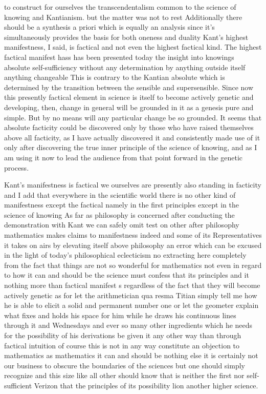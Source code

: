 \documentclass{article}
\begin{document}
to construct for ourselves the transcendentalism
common to the science of knowing and Kantianism.
but the matter was not to rest
Additionally there should be a synthesis a priori
which is equally an analysis
since it's simultaneously provides the basis for both oneness and duality 
Kant's highest manifestness, I said, is factical and not even the highest factical kind.
The highest factical manifest hass has been presented today 
the insight into knowings absolute self-sufficiency
without any determination by anything outside itself anything changeable
This is contrary to the Kantian absolute which is determined by 
the transition between the sensible and supersensible. 
Since now this presently factical element in science is itself 
to become actively genetic and developing, then, 
change in general will be grounded in it
as a genesis pure and simple.
But by no means will any particular change be so grounded.
It seems that absolute facticity could be discovered only by those
who have raised themselves above all facticity,
as I have actually discovered it 
and consistently made use of it 
only after discovering the true inner principle of the science of knowing,
and as I am using it now to lead the audience
from that point forward in the genetic process.

Kant's manifestness is factical
we ourselves are presently also standing in facticity
and I add that everywhere in the scientific world
there is no other kind of manifestness except the factical
namely in the first principles
except in the science of knowing
As far as philosophy is concerned
after conducting the demonstration with Kant 
we can safely omit test on other
after philosophy mathematics makes claims to manifestness
indeed and some of its Representatives it takes on airs
by elevating itself above philosophy
an error which can be excused
in the light of today's philosophical eclecticism
no extracting here completely from the fact that
things are not so wonderful for mathematics
not even in regard to how it can and should be
the science must confess that its principles 
and it nothing more than factical manifest
s regardless of the fact that they will become actively genetic as
for let the arithmetician qua resma Titian simply tell me
how he is able to elicit a solid and permanent number one
or let the geometer explain what fixes and holds his space for him
while he draws his continuous lines through it and Wednesdays 
and ever so many other ingredients which he needs for the possibility
of his derivations be given it any other way than through factical intuition
of course this is not in any way constitute an objection
to mathematics as mathematics it can and should be nothing else
it is certainly not our business to obscure the boundaries of the sciences
but one should simply recognize and this size like all other should know
that is neither the first nor self-sufficient 
Verizon that the principles of its possibility lion another higher science.
\end{document}
